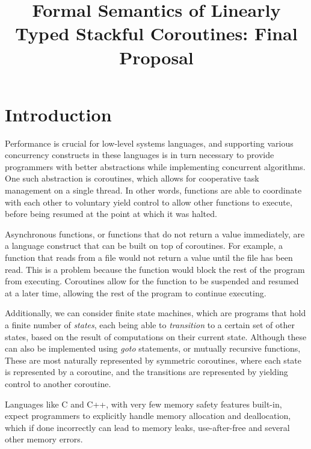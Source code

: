 \documentclass[review,twocolumn,preprint]{sigplanconf}
\begin{document}
\title{Formal Semantics of Linearly Typed Stackful Coroutines: Final Proposal}
\date{}

\maketitle


\section{Introduction}


Performance is crucial for low-level systems languages, and supporting various concurrency constructs in these languages is in turn necessary to provide programmers with better abstractions while implementing concurrent algorithms. One such abstraction is coroutines, which allows for cooperative task management on a single thread. In other words, functions are able to coordinate with each other to voluntary yield control to allow other functions to execute, before being resumed at the point at which it was halted.

Asynchronous functions, or functions that do not return a value immediately, are a language construct that can be built on top of coroutines. For example, a function that reads from a file would not return a value until the file has been read. This is a problem because the function would block the rest of the program from executing. Coroutines allow for the function to be suspended and resumed at a later time, allowing the rest of the program to continue executing.

Additionally, we can consider finite state machines, which are programs that hold a finite number of \textit{states}, each being able to \textit{transition} to a certain set of other states, based on the result of computations on their current state. Although these can also be implemented using \textit{goto} statements, or mutually recursive functions, These are most naturally represented by symmetric coroutines, where each state is represented by a coroutine, and the transitions are represented by yielding control to another coroutine.

Languages like C and C++, with very few memory safety features built-in, expect programmers to explicitly handle memory allocation and deallocation, which if done incorrectly can lead to memory leaks, use-after-free and several other memory errors.
\end{document}
